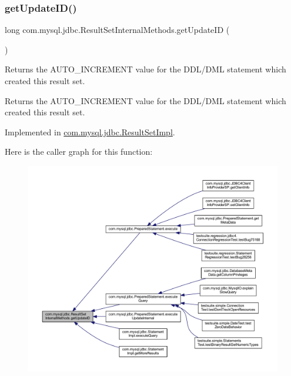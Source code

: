 \subsubsection{\texorpdfstring{get\+Update\+I\+D()}{getUpdateID()}}
{\footnotesize\ttfamily long com.\+mysql.\+jdbc.\+Result\+Set\+Internal\+Methods.\+get\+Update\+ID (\begin{DoxyParamCaption}{ }\end{DoxyParamCaption})}

Returns the A\+U\+T\+O\+\_\+\+I\+N\+C\+R\+E\+M\+E\+NT value for the D\+D\+L/\+D\+ML statement which created this result set.

\begin{DoxyReturn}{Returns}
the A\+U\+T\+O\+\_\+\+I\+N\+C\+R\+E\+M\+E\+NT value for the D\+D\+L/\+D\+ML statement which created this result set. 
\end{DoxyReturn}


Implemented in \mbox{\hyperlink{classcom_1_1mysql_1_1jdbc_1_1_result_set_impl_a8dc70e234b2271c66c1e5b239b252b13}{com.\+mysql.\+jdbc.\+Result\+Set\+Impl}}.

Here is the caller graph for this function\+:
\nopagebreak
\begin{figure}[H]
\begin{center}
\leavevmode
\includegraphics[width=350pt]{interfacecom_1_1mysql_1_1jdbc_1_1_result_set_internal_methods_ae53e8a9c6f65d29a46883ba31b41ace2_icgraph}
\end{center}
\end{figure}
\mbox{\label{interfacecom_1_1mysql_1_1jdbc_1_1_result_set_internal_methods_ab7d1d10caf4c61a3472928f695361c24}} 
